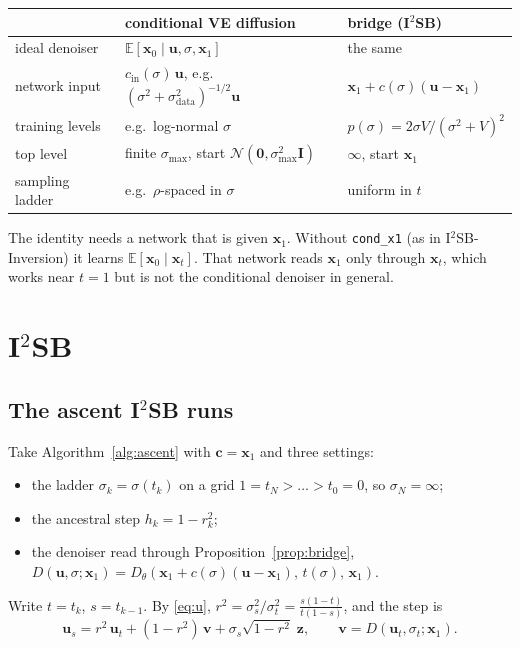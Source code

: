 \documentclass[11pt]{article}
\newcommand{\x}{\bm{x}}
\newcommand{\uu}{\bm{u}}
\newcommand{\vv}{\bm{v}}
\newcommand{\cc}{\bm{c}}
\newcommand{\zz}{\bm{z}}
\newcommand{\E}{\mathbb{E}}
\newcommand{\N}{\mathcal{N}}
\newcommand{\Id}{\bm{I}}
\newcommand{\D}{D_\theta}
\begin{document}
\begin{center}
\small
\begin{tabular}{@{}lll@{}}
\toprule
 & conditional VE diffusion & bridge (I$^2$SB) \\
\midrule
ideal denoiser & $\E[\x_0\mid\uu,\sigma,\x_1]$ & the same \\
network input & $c_{\mathrm{in}}(\sigma)\,\uu$, e.g.\ $(\sigma^2+\sigma_{\mathrm{data}}^2)^{-1/2}\uu$
  & $\x_1 + c(\sigma)(\uu-\x_1)$ \\
training levels & e.g.\ log-normal $\sigma$ & $p(\sigma) = 2\sigma V/(\sigma^2+V)^2$ \\
top level & finite $\sigma_{\max}$, start $\N(\bm0,\sigma_{\max}^2\Id)$ & $\infty$, start $\x_1$ \\
sampling ladder & e.g.\ $\rho$-spaced in $\sigma$ & uniform in $t$ \\
\bottomrule
\end{tabular}
\end{center}

\noindent The identity needs a network that is given $\x_1$. Without \texttt{cond\_x1} (as in
I$^2$SB-Inversion) it learns $\E[\x_0\mid\x_t]$. That network reads $\x_1$ only through $\x_t$,
which works near $t=1$ but is not the conditional denoiser in general.

\section{I\texorpdfstring{$^2$}{2}SB}\label{sec:i2sb}

\subsection{The ascent I\texorpdfstring{$^2$}{2}SB runs}

Take Algorithm~\ref{alg:ascent} with $\cc=\x_1$ and three settings:
\begin{itemize}[leftmargin=1.5em, itemsep=1pt]
  \item the ladder $\sigma_k=\sigma(t_k)$ on a grid $1=t_N>\dots>t_0=0$, so $\sigma_N=\infty$;
  \item the ancestral step $h_k = 1-r_k^2$;
  \item the denoiser read through Proposition~\ref{prop:bridge},
        $D(\uu,\sigma;\x_1) = \D(\x_1 + c(\sigma)(\uu-\x_1),\,t(\sigma),\,\x_1)$.
\end{itemize}
Write $t=t_k$, $s=t_{k-1}$. By \eqref{eq:u}, $r^2 = \sigma_s^2/\sigma_t^2 = \frac{s(1-t)}{t(1-s)}$,
and the step is
\begin{equation}
  \uu_s = r^2\,\uu_t + (1-r^2)\,\vv + \sigma_s\sqrt{1-r^2}\;\zz,\qquad
  \vv = D(\uu_t,\sigma_t;\x_1).
  \label{eq:ustep}
\end{equation}
\end{document}
